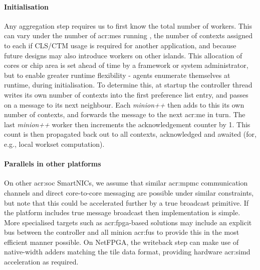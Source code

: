 \paragraph{Initialisation}
Any aggregation step requires us to first know the total number of workers.
This can vary under the number of \glspl{acr:me} running \approachshort{}, the number of contexts assigned to each if CLS/CTM usage is required for another application, and because future designs may also introduce workers on other islands.
This allocation of cores or chip area is set ahead of time by a framework or system administrator, but to enable greater runtime flexibility \approachshort{}-\Coopfw{} agents enumerate themselves at runtime, during initialisation.
To determine this, at startup the controller thread writes its own number of contexts into the first preference list entry, and passes on a message to its next neighbour.
Each \emph{minion++} then adds to this its own number of contexts, and forwards the message to the next \gls{acr:me} in turn.
The last \emph{minion++} worker then increments the acknowledgement counter by 1.
This count is then propagated back out to all contexts, acknowledged and awaited (for, e.g., local workset computation).

\paragraph{Parallels in other platforms}
On other \gls{acr:soc} SmartNICs, we assume that similar \gls{acr:mpmc} communication channels and direct core-to-core messaging are possible under similar constraints, but note that this could be accelerated further by a true broadcast primitive.
If the platform includes true message broadcast then implementation is simple.
More specialised targets such as \gls{acr:fpga}-based solutions may include an explicit bus between the controller and all minion \glspl{acr:fu} to provide this in the most efficient manner possible.
On NetFPGA, the writeback step can make use of native-width adders matching the tile data format, providing hardware \gls{acr:simd} acceleration as required.

%

